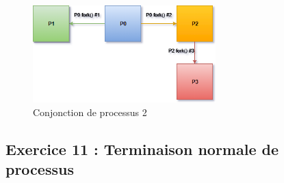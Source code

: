 \inputminted[linenos,firstline=5, lastline=8]{cpp}{../sources/cpp/TP5-6/ex10-conjonction2.c}
\begin{figure}[H]
\centering
\includegraphics[width=200pt]{./cpp/Pictures/tp5+tp6-ex10-conjonction2}
\caption{Conjonction de processus 2}
\label{Conjonction de processus 2}
\end{figure}

\subsection{Exercice 11 : Terminaison normale de processus}
\inputminted[linenos,firstline=5, lastline=11]{cpp}{../sources/cpp/TP5-6/ex11-programme1.c}
\inputminted[linenos,firstline=5, lastline=14]{cpp}{../sources/cpp/TP5-6/ex11-programme2.c}
\inputminted[linenos,firstline=5, lastline=19]{cpp}{../sources/cpp/TP5-6/ex11-programme3.c}
